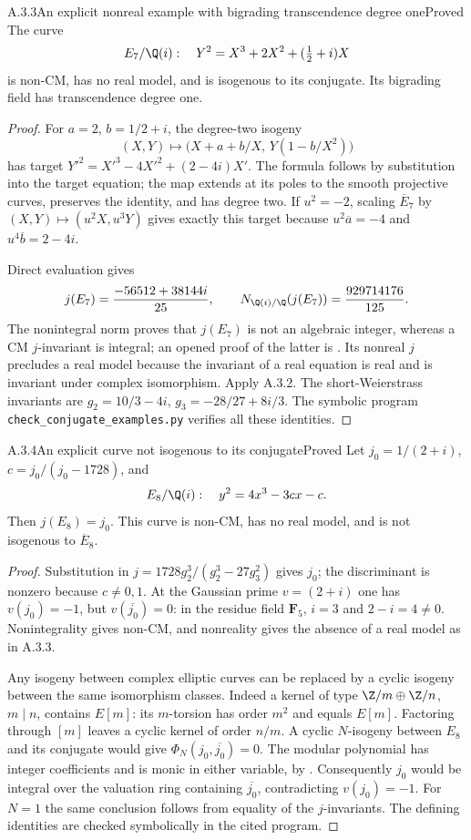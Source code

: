 \begin{result}{A.3.3}{An explicit nonreal example with bigrading transcendence degree one}{Proved}
The curve
\[
 E_7/\Q(i):\quad Y^2=X^3+2X^2+(\tfrac12+i)X
\]
is non-CM, has no real model, and is isogenous to its conjugate. Its bigrading field has transcendence degree one.
\end{result}
\begin{proof}
For $a=2$, $b=1/2+i$, the degree-two isogeny
\[
 (X,Y)\longmapsto\bigl(X+a+b/X,\,Y(1-b/X^2)\bigr)
\]
has target $Y'^2=X'^3-4X'^2+(2-4i)X'$. The formula follows by substitution into the target equation; the map extends at its poles to the smooth projective curves, preserves the identity, and has degree two. If $u^2=-2$, scaling $\overline E_7$ by $(X,Y)\mapsto(u^2X,u^3Y)$ gives exactly this target because $u^2\overline a=-4$ and $u^4\overline b=2-4i$.

Direct evaluation gives
\[
 j(E_7)=\frac{-56512+38144i}{25},\qquad
 N_{\Q(i)/\Q}(j(E_7))=\frac{929714176}{125}.
\]
The nonintegral norm proves that $j(E_7)$ is not an algebraic integer, whereas a CM $j$-invariant is integral; an opened proof of the latter is \cite[Theorem 12.14 and Corollaries 12.15--12.16, pp.119--120]{EllMilneMF}. Its nonreal $j$ precludes a real model because the invariant of a real equation is real and is invariant under complex isomorphism. Apply A.3.2. The short-Weierstrass invariants are $g_2=10/3-4i$, $g_3=-28/27+8i/3$. The symbolic program \texttt{check\_conjugate\_examples.py} verifies all these identities.
\end{proof}

\begin{result}{A.3.4}{An explicit curve not isogenous to its conjugate}{Proved}
Let $j_0=1/(2+i)$, $c=j_0/(j_0-1728)$, and
\[
 E_8/\Q(i):\quad y^2=4x^3-3cx-c.
\]
Then $j(E_8)=j_0$. This curve is non-CM, has no real model, and is not isogenous to $\overline E_8$.
\end{result}
\begin{proof}
Substitution in $j=1728g_2^3/(g_2^3-27g_3^2)$ gives $j_0$; the discriminant is nonzero because $c\ne0,1$. At the Gaussian prime $v=(2+i)$ one has $v(j_0)=-1$, but $v(\overline{j_0})=0$: in the residue field $\mathbf F_5$, $i=3$ and $2-i=4\ne0$. Nonintegrality gives non-CM, and nonreality gives the absence of a real model as in A.3.3.

Any isogeny between complex elliptic curves can be replaced by a cyclic isogeny between the same isomorphism classes. Indeed a kernel of type $\Z/m\oplus\Z/n$, $m\mid n$, contains $E[m]$: its $m$-torsion has order $m^2$ and equals $E[m]$. Factoring through $[m]$ leaves a cyclic kernel of order $n/m$. A cyclic $N$-isogeny between $E_8$ and its conjugate would give $\Phi_N(j_0,\overline{j_0})=0$. The modular polynomial has integer coefficients and is monic in either variable, by \cite[Theorem 6.1 and its proof, pp.82--83]{EllMilneMF}. Consequently $j_0$ would be integral over the valuation ring containing $\overline{j_0}$, contradicting $v(j_0)=-1$. For $N=1$ the same conclusion follows from equality of the $j$-invariants. The defining identities are checked symbolically in the cited program.
\end{proof}

